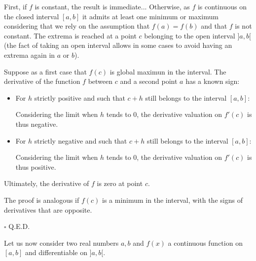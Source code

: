 \begin{dem}
First, if $f$ is constant, the result is immediate... Otherwise, as $f$ is continuous on the closed interval $[a, b]$ it admits at least one minimum or maximum considering that we rely on the assumption that $f(a)=f(b)$ and that $f$ is not constant. The extrema is reached at a point $c$ belonging to the open interval $] a, b [$ (the fact of taking an open interval allows in some cases to avoid having an extrema again in $a$ or $b$).

Suppose as a first case that $f(c)$ is global maximun in the interval. The derivative of the function $f$ between $c$ and a second point $a$ has a known sign:

	\begin{itemize}
		\item For $h$ strictly positive and such that $c + h$ still belongs to the interval $[a, b]$:
	
Considering the limit when $h$ tends to $0$, the  derivative valuation on $f'(c)$ is thus negative.
	 \item For $h$ strictly negative and such that $c + h$ still belongs to the interval $[a, b]$:
	
Considering the limit when $h$ tends to $0$, the  derivative valuation on $f'(c)$ is thus positive.
	\end{itemize}
Ultimately, the derivative of $f$ is zero at point $c$.

The proof is analogous if $f(c)$ is a minimum in the interval, with the signs of derivatives that are opposite.
		\begin{flushright}
			$\square$  Q.E.D.
		\end{flushright}
\end{dem}
Let us now consider two real numbers $a,b$ and $f (x) $ a continuous function on $[a, b]$ and differentiable on $] a, b [$. 

